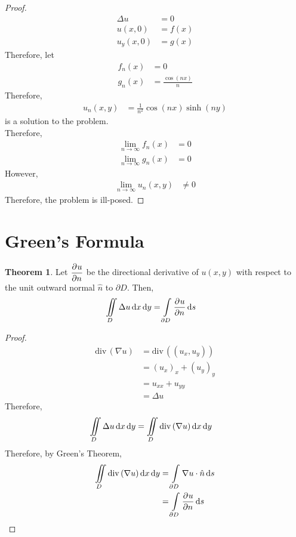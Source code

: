 \documentclass[titlepage, fleqn, a4paper, 12pt, twoside]{article}
\theoremstyle{definition}
\theoremstyle{theorem}
\newtheorem{theorem}{Theorem}
\newcommand{\divergence}{\mathrm{div\,}}
\begin{document}
\begin{proof}
	\begin{align*}
		\Delta u & = 0    \\
		u(x,0)   & = f(x) \\
		u_y(x,0) & = g(x)
	\end{align*}
	Therefore, let
	\begin{align*}
		f_n(x) & = 0 \\
		g_n(x) & = \frac{\cos(n x)}{n}
	\end{align*}
	Therefore,
	\begin{align*}
		u_n(x,y) & = \frac{1}{n^2} \cos(n x) \sinh(n y)
	\end{align*}
	is a solution to the problem.\\
	Therefore,
	\begin{align*}
		\lim\limits_{n \to \infty} f_n(x) & = 0 \\
		\lim\limits_{n \to \infty} g_n(x) & = 0
	\end{align*}
	However,
	\begin{align*}
		\lim\limits_{n \to \infty} u_n(x,y) & \neq 0
	\end{align*}
	Therefore, the problem is ill-posed.
\end{proof}

\section{Green's Formula}

\begin{theorem}
	Let $\dpd{u}{n}$ be the directional derivative of $u(x,y)$ with respect to the unit outward normal $\hat{n}$ to $\partial D$.
	Then,
	\begin{align*}
		\iint\limits_{D} \Delta u \dif x \dif y & = \int\limits_{\partial D} \dpd{u}{n} \dif s
	\end{align*}
\end{theorem}

\begin{proof}
	\begin{align*}
		\divergence(\nabla u) & = \divergence\left( (u_x,u_y) \right) \\
                                      & = (u_x)_x + (u_y)_y                   \\
                                      & = u_{x x} + u_{y y}                   \\
                                      & = \Delta u
	\end{align*}
	Therefore,
	\begin{align*}
		\iint\limits_{D} \Delta u \dif x \dif y & = \iint\limits_{D} \divergence(\nabla u) \dif x \dif y
	\end{align*}
	Therefore, by Green's Theorem,
	\begin{align*}
		\iint\limits_{D} \divergence(\nabla u) \dif x \dif y & = \int\limits_{\partial D} \nabla u \cdot \hat{n} \dif s \\
                                                                     & = \int\limits_{\partial D} \dpd{u}{n} \dif s
	\end{align*}
\end{proof}
\end{document}
